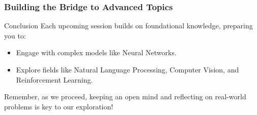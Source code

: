 \documentclass[aspectratio=169]{beamer}
\begin{document}
\begin{frame}[fragile]
    \frametitle{Building the Bridge to Advanced Topics}
    \begin{block}{Conclusion}
        Each upcoming session builds on foundational knowledge, preparing you to:
        \begin{itemize}
            \item Engage with complex models like Neural Networks.
            \item Explore fields like Natural Language Processing, Computer Vision, and Reinforcement Learning.
        \end{itemize}
        Remember, as we proceed, keeping an open mind and reflecting on real-world problems is key to our exploration!
    \end{block}
\end{frame}
\end{document}

